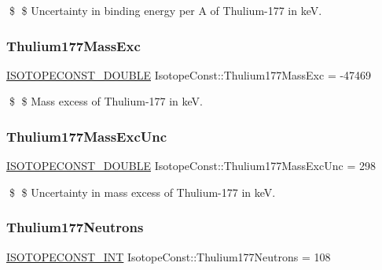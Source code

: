 \$ \$ Uncertainty in binding energy per A of Thulium-\/177 in keV. \mbox{\label{group___isotope_const-_thulium-_tm177_gac46b2a813a53e58c1bb5c66e553685a5}} 
\subsubsection{\texorpdfstring{Thulium177\+Mass\+Exc}{Thulium177MassExc}}
{\footnotesize\ttfamily \mbox{\hyperlink{group___isotope_const-_macros_ga8f45a7272ce02c0b4c65c44636ed719a}{I\+S\+O\+T\+O\+P\+E\+C\+O\+N\+S\+T\+\_\+\+D\+O\+U\+B\+LE}} Isotope\+Const\+::\+Thulium177\+Mass\+Exc = -\/47469}

\$ \$ Mass excess of Thulium-\/177 in keV. \mbox{\label{group___isotope_const-_thulium-_tm177_gac51cffb1e293d59e721651dbd629c320}} 
\subsubsection{\texorpdfstring{Thulium177\+Mass\+Exc\+Unc}{Thulium177MassExcUnc}}
{\footnotesize\ttfamily \mbox{\hyperlink{group___isotope_const-_macros_ga8f45a7272ce02c0b4c65c44636ed719a}{I\+S\+O\+T\+O\+P\+E\+C\+O\+N\+S\+T\+\_\+\+D\+O\+U\+B\+LE}} Isotope\+Const\+::\+Thulium177\+Mass\+Exc\+Unc = 298}

\$ \$ Uncertainty in mass excess of Thulium-\/177 in keV. \mbox{\label{group___isotope_const-_thulium-_tm177_ga012a277619746be9edf9de7f8a7f29fe}} 
\subsubsection{\texorpdfstring{Thulium177\+Neutrons}{Thulium177Neutrons}}
{\footnotesize\ttfamily \mbox{\hyperlink{group___isotope_const-_macros_ga5f18360b3e99483a35c32d789e62621c}{I\+S\+O\+T\+O\+P\+E\+C\+O\+N\+S\+T\+\_\+\+I\+NT}} Isotope\+Const\+::\+Thulium177\+Neutrons = 108}

